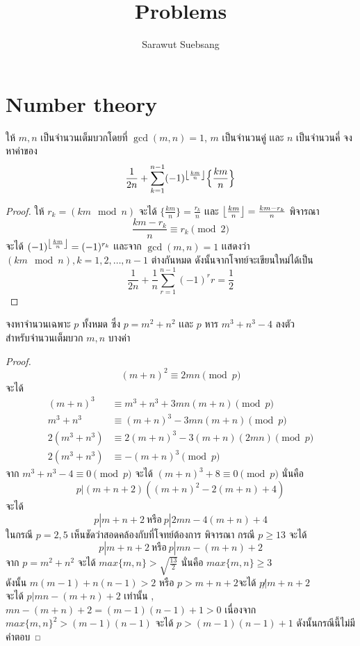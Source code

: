 \documentclass[a4paper,12pt]{scrartcl}
\title{\textbf{Problems}}
\author{Sarawut Suebsang}
\begin{document}
	\maketitle
\section{Number theory}

	\begin{example}
		ให้ $m,n$ เป็นจำนวนเต็มบวกโดยที่ $\gcd(m,n) = 1 $, $m$ เป็นจำนวนคู่ เเละ $n$ เป็นจำนวนคี่ จงหาค่าของ \[ \frac{1}{2n} + \sum_{k=1}^{n-1}(-1)^{\left\lfloor \frac{km}{n} \right\rfloor}\Big\{ \frac{km}{n} \Big\} \] 
	\end{example}
\begin{proof}
	ให้ $r_k = (km\mod n)$ จะได้ $\Big\{ \frac{km}{n} \Big\} = \frac{r_k}{n}$ เเละ $\left\lfloor \frac{km}{n} \right\rfloor = \frac{km-r_k}{n}$
	พิจารณา \[ 
	\frac{km-r_k}{n} \equiv r_k \pmod 2 \]
	จะได้ $ (-1)^{\left\lfloor \frac{km}{n} \right\rfloor} = (-1)^{r_k} $ เเละจาก $\gcd(m,n) =1$ เเสดงว่า $(km \mod n) , k=1,2,\dots,n-1$ ต่างกันหมด ดังนั้นจากโจทย์จะเขียนใหม่ได้เป็น \\
	\[ \frac{1}{2n}+\frac{1}{n} \sum_{r=1}^{n-1} (-1)^rr = \frac{1}{2} \]
	  
\end{proof}

	\begin{example}
		จงหาจำนวนเฉพาะ $p$ ทั้งหมด ซึ่ง $p = m^2+n^2$ เเละ $p$ หาร $m^3+n^3-4$ ลงตัว \\ 
		สำหรับจำนวนเต็มบวก $m,n$ บางค่า
	\end{example}
\begin{proof}
	\[ (m+n)^2 \equiv 2mn \pmod p \] จะได้
	\begin{align*}
		(m+n)^3 & \equiv m^3+n^3+ 3mn(m+n) \pmod p \\
		m^3+n^3 &\equiv (m+n)^3 - 3mn(m+n) \pmod p \\
		2(m^3+n^3 )&\equiv 2(m+n)^3 -3(m+n)(2mn) \pmod p \\
		2(m^3+n^3 )&\equiv - (m+n)^3 \pmod p
	\end{align*}
จาก $m^3+n^3 - 4 \equiv 0 \pmod p$ จะได้ $(m+n)^3+8 \equiv 0 \pmod p$ นั่นคือ \[ p |(m+n+2)((m+n)^2-2(m+n)+4) \] 	จะได้ \[ p| m+n+2 \: \textrm{หรือ} \: p|2mn-4(m+n)+4 \]
ในกรณี $p =2,5$ เห็นชัดว่าสอดคล้องกับที่โจทย์ต้องการ 
พิจารณา กรณี $p\ge13$ จะได้ \[ p| m+n+2 \: \textrm{หรือ} \: p|mn-(m+n)+2 \]
 จาก $p = m^2+n^2$ จะได้ $max\{m,n \} > \sqrt{\frac{13}{2}}$  นั่นคือ $max\{m,n \}  \ge 3$ \\ ดังนั้น $m(m-1)+n(n-1) > 2$ หรือ $p>m+n+2$จะได้ $p \not |
 m+n+ 2$ \\ จะได้ $p | mn-(m+n)+2 $ เท่านั้น  , $mn-(m+n)+2 =(m-1)(n-1)+1 >0$ 
 เนื่องจาก $max\{m,n\}^2 > (m-1)(n-1) $ จะได้ $p> (m-1)(n-1)+1$ ดังนั้นกรณีนี้ไม่มีคำตอบ
\end{proof}
\end{document}
